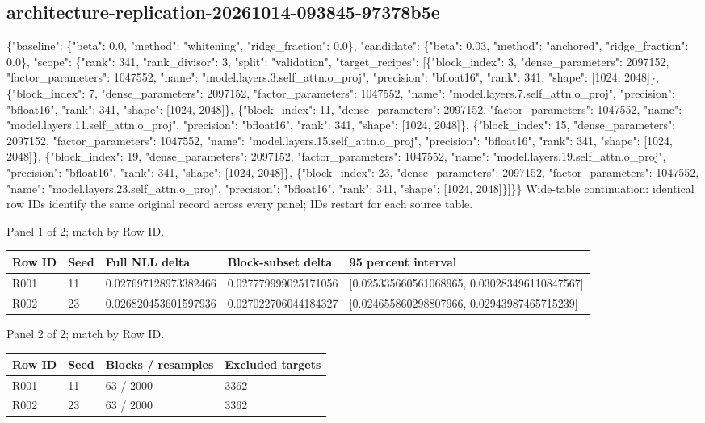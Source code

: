 \documentclass[10pt]{article}
\begin{document}
\subsection{architecture-replication-20261014-093845-97378b5e}
\{"baseline": \{"beta": 0.0, "method": "whitening", "ridge\_fraction": 0.0\}, "candidate": \{"beta": 0.03, "method": "anchored", "ridge\_fraction": 0.0\}, "scope": \{"rank": 341, "rank\_divisor": 3, "split": "validation", "target\_recipes": [\{"block\_index": 3, "dense\_parameters": 2097152, "factor\_parameters": 1047552, "name": "model.layers.3.self\_attn.o\_proj", "precision": "bfloat16", "rank": 341, "shape": [1024, 2048]\}, \{"block\_index": 7, "dense\_parameters": 2097152, "factor\_parameters": 1047552, "name": "model.layers.7.self\_attn.o\_proj", "precision": "bfloat16", "rank": 341, "shape": [1024, 2048]\}, \{"block\_index": 11, "dense\_parameters": 2097152, "factor\_parameters": 1047552, "name": "model.layers.11.self\_attn.o\_proj", "precision": "bfloat16", "rank": 341, "shape": [1024, 2048]\}, \{"block\_index": 15, "dense\_parameters": 2097152, "factor\_parameters": 1047552, "name": "model.layers.15.self\_attn.o\_proj", "precision": "bfloat16", "rank": 341, "shape": [1024, 2048]\}, \{"block\_index": 19, "dense\_parameters": 2097152, "factor\_parameters": 1047552, "name": "model.layers.19.self\_attn.o\_proj", "precision": "bfloat16", "rank": 341, "shape": [1024, 2048]\}, \{"block\_index": 23, "dense\_parameters": 2097152, "factor\_parameters": 1047552, "name": "model.layers.23.self\_attn.o\_proj", "precision": "bfloat16", "rank": 341, "shape": [1024, 2048]\}]\}\}
Wide-table continuation: identical row IDs identify the same original record across every panel; IDs restart for each source table.
\par\noindent Panel 1 of 2; match by Row ID.
{\scriptsize\setlength{\tabcolsep}{2pt}
\begin{longtable}{p{}p{}p{}p{}p{}}
Row ID & Seed & Full NLL delta & Block-subset delta & 95 percent interval \\
\hline\endhead
R001 & 11 & 0.027697128973382466 & 0.027779999025171056 & [0.025335660561068965, 0.030283496110847567] \\
R002 & 23 & 0.026820453601597936 & 0.027022706044184327 & [0.024655860298807966, 0.02943987465715239] \\
\end{longtable}}
\par\noindent Panel 2 of 2; match by Row ID.
{\scriptsize\setlength{\tabcolsep}{2pt}
\begin{longtable}{p{}p{}p{}p{}}
Row ID & Seed & Blocks / resamples & Excluded targets \\
\hline\endhead
R001 & 11 & 63 / 2000 & 3362 \\
R002 & 23 & 63 / 2000 & 3362 \\
\end{longtable}}
\end{document}
